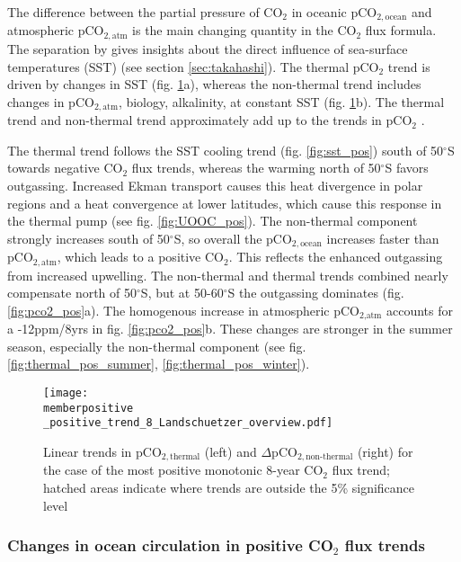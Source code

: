 \documentclass[12pt]{article}
\newcommand{\memberpositive}{m178_1985_1992} %
\begin{document}
The difference between the partial pressure of CO$_2$ in oceanic pCO$_{2,\text{ocean}}$ and atmospheric pCO$_{2,\text{atm}}$ is the main changing quantity in the CO$_2$ flux formula. The separation by \cite{Takahashi2002} gives insights about the direct influence of sea-surface temperatures (SST) (see section \ref{sec:takahashi}). The thermal pCO$_2$ trend is driven by changes in SST (fig. \ref{fig:thermal_pos}a), whereas the non-thermal trend includes changes in pCO$_{2,\text{atm}}$, biology, alkalinity, at constant SST (fig. \ref{fig:thermal_pos}b). The thermal trend and non-thermal trend approximately add up to the trends in pCO$_2$ \citep{landschuetzer2015}.

The thermal trend follows the SST cooling trend (fig. \ref{fig:sst_pos}) south of 50$^\circ$S towards negative CO$_2$ flux trends, whereas the warming north of 50$^\circ$S favors outgassing. Increased Ekman transport causes this heat divergence in polar regions and a heat convergence at lower latitudes, which cause this response in the thermal pump \citep{Hall2002} (see fig. \ref{fig:UOOC_pos}). The non-thermal component strongly increases south of 50$^\circ$S, so overall the pCO$_{2,\text{ocean}}$ increases faster than pCO$_{2,\text{atm}}$, which leads to a positive CO$_2$. This reflects the enhanced outgassing from increased upwelling. The non-thermal and thermal trends combined nearly compensate north of 50$^\circ$S, but at 50-60$^\circ$S the outgassing dominates (fig. \ref{fig:pco2_pos}a). The homogenous increase in atmospheric pCO$_{\text{2,atm}}$ accounts for a -12ppm/8yrs in fig. \ref{fig:pco2_pos}b. 
These changes are stronger in the summer season, especially the non-thermal component (see fig. \ref{fig:thermal_pos_summer}, \ref{fig:thermal_pos_winter}). 

\begin{figure}[h!]
\centering
	\texttt{[image: \\memberpositive \_positive\_trend\_8\_Landschuetzer\_overview.pdf]}
	\caption{Linear trends in pCO$_{2,\text{thermal}}$ (left) and $\Delta$pCO$_{2,\text{non-thermal}}$ (right) for the case of the most positive monotonic 8-year CO$_2$ flux trend; hatched areas indicate where trends are outside the 5\% significance level}
	\label{fig:thermal_pos}
\end{figure}



\clearpage

\subsubsection{Changes in ocean circulation in positive CO$_2$ flux trends}
\label{sec:trends_pos_circulation}
\end{document}

